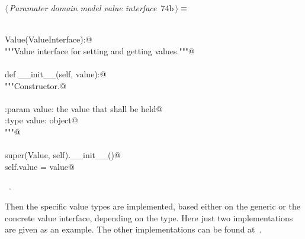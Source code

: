 \documentclass[
    a4paper,      %
    10pt,         %
    openright,    %
    notitlepage,  %
    parskip=half, %
]{scrreprt}       %
\theoremstyle{definition}                    %
\begin{document}
\begin{flushleft} \small
\begin{minipage}{\linewidth}\label{scrap121}\raggedright\small
{} $\langle\,${\itshape Paramater domain model value interface}\nobreak\ {\footnotesize {74b}}$\,\rangle\equiv$
\vspace{-1exm}
\begin{list}{}{} \item
\mbox{}\lstinline@@\\
\mbox{}\lstinline@class Value(ValueInterface):@\\
\mbox{}\lstinline@    """Value interface for setting and getting values."""@\\
\mbox{}\lstinline@@\\
\mbox{}\lstinline@    def __init__(self, value):@\\
\mbox{}\lstinline@        """Constructor.@\\
\mbox{}\lstinline@@\\
\mbox{}\lstinline@        :param value: the value that shall be held@\\
\mbox{}\lstinline@        :type  value: object@\\
\mbox{}\lstinline@        """@\\
\mbox{}\lstinline@@\\
\mbox{}\lstinline@        super(Value, self).__init__()@\\
\mbox{}\lstinline@        self.value = value@{\NWsep}
\end{list}
\vspace{-1.5ex}
\footnotesize
\begin{list}{}{\setlength{\itemsep}{-\parsep}\setlength{\itemindent}{-\leftmargin}}
\item \NWtxtMacroRefIn\ .

\item{}
\end{list}
\end{minipage}\vspace{4ex}
\end{flushleft}
Then the specific value types are implemented, based either on the generic or
the concrete value interface, depending on the type. Here just two
implementations are given as an example. The other implementations can be found
at~.
\end{document}
